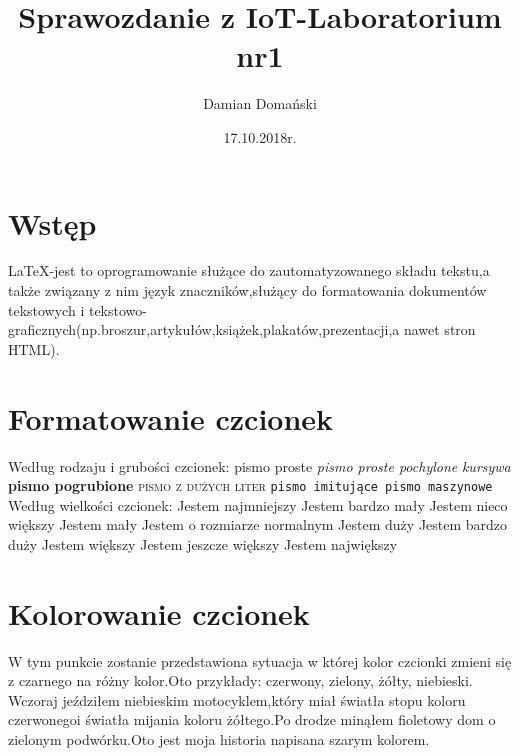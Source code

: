 \documentclass[11pt,a4paper]{article}
\title{Sprawozdanie z IoT-Laboratorium nr1}
\author{Damian Domański}
\date{17.10.2018r.}
\begin{document}
\maketitle 
\section{Wstęp}\label{sec:begin}
LaTeX-jest to oprogramowanie służące do zautomatyzowanego składu tekstu,a także związany z nim język znaczników,służący do formatowania dokumentów tekstowych i tekstowo-graficznych(np.broszur,artykułów,książek,plakatów,prezentacji,a nawet stron HTML).
\section{Formatowanie czcionek}\label{sec:form}
Według rodzaju i grubości czcionek:\newline\newline
\textrm{pismo proste}\newline
\textsl{pismo proste pochylone}\newline
\textit{kursywa}\newline
\textbf{pismo pogrubione}\newline
\textsc{pismo z dużych liter}\newline
\texttt{pismo imitujące pismo maszynowe}\newline\newline
Według wielkości czcionek:\newline\newline
{\tiny Jestem najmniejszy}\newline
{\scriptsize Jestem bardzo mały}\newline
{\footnotesize Jestem nieco większy}\newline
{\small Jestem mały}\newline
{\normalsize Jestem o rozmiarze normalnym}\newline
{\large Jestem duży}\newline
{\Large Jestem bardzo duży}\newline
{\LARGE Jestem większy}\newline
{\huge Jestem jeszcze większy}\newline
{\Huge Jestem największy}\newline
\section{Kolorowanie czcionek}\label{sec:kolor}
W tym punkcie zostanie przedstawiona sytuacja w której kolor czcionki zmieni się z czarnego na różny kolor.Oto przykłady:\newline
{\color{red}czerwony,}
{\color{green}zielony,}
{\color{yellow}żółty,}
{\color{blue}niebieski.}\newline
Wczoraj jeździłem {\color{blue}niebieskim motocyklem},który miał światła stopu {\color{red}koloru czerwonego}i światła mijania {\color{yellow}koloru żółtego}.\newline Po drodze minąłem {\color{violet}fioletowy dom} o {\color{green}zielonym podwórku.}\newline Oto jest {\color{gray}moja historia napisana szarym kolorem.}\newline\newline
\end{document}
